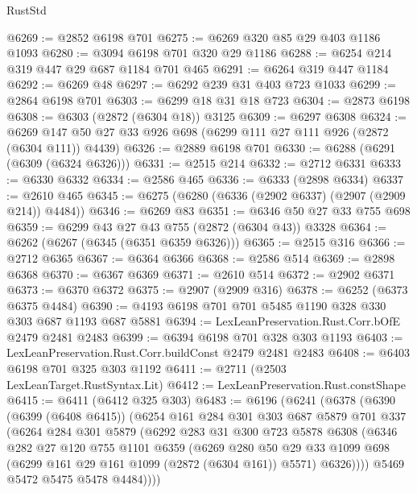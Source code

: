 \begin{lexlean}{RustStd}
\begin{coremodule}
@6269 := @2852 @6198 @701
@6275 := @6269 @320 @85 @29 @403 @1186 @1093
@6280 := @3094 @6198 @701 @320 @29 @1186
@6288 := @6254 @214 @319 @447 @29 @687 @1184 @701 @465
@6291 := @6264 @319 @447 @1184
@6292 := @6269 @48
@6297 := @6292 @239 @31 @403 @723 @1033
@6299 := @2864 @6198 @701
@6303 := @6299 @18 @31 @18 @723
@6304 := @2873 @6198
@6308 := @6303 (@2872 (@6304 @18)) @3125
@6309 := @6297 @6308
@6324 := @6269 @147 @50 @27 @33 @926 @698 (@6299 @111 @27 @111 @926 (@2872 (@6304 @111)) @4439)
@6326 := @2889 @6198 @701
@6330 := @6288 (@6291 (@6309 (@6324 @6326)))
@6331 := @2515 @214
@6332 := @2712 @6331
@6333 := @6330 @6332
@6334 := @2586 @465
@6336 := @6333 (@2898 @6334)
@6337 := @2610 @465
@6345 := @6275 (@6280 (@6336 (@2902 @6337) (@2907 (@2909 @214)) @4484))
@6346 := @6269 @83
@6351 := @6346 @50 @27 @33 @755 @698
@6359 := @6299 @43 @27 @43 @755 (@2872 (@6304 @43)) @3328
@6364 := @6262 (@6267 (@6345 (@6351 @6359 @6326)))
@6365 := @2515 @316
@6366 := @2712 @6365
@6367 := @6364 @6366
@6368 := @2586 @514
@6369 := @2898 @6368
@6370 := @6367 @6369
@6371 := @2610 @514
@6372 := @2902 @6371
@6373 := @6370 @6372
@6375 := @2907 (@2909 @316)
@6378 := @6252 (@6373 @6375 @4484)
@6390 := @4193 @6198 @701 @701 @5485 @1190 @328 @330 @303 @687 @1193 @687 @5881
@6394 := LexLeanPreservation.Rust.Corr.bOfE @2479 @2481 @2483
@6399 := @6394 @6198 @701 @328 @303 @1193
@6403 := LexLeanPreservation.Rust.Corr.buildConst @2479 @2481 @2483
@6408 := @6403 @6198 @701 @325 @303 @1192
@6411 := @2711 (@2503 LexLeanTarget.RustSyntax.Lit)
@6412 := LexLeanPreservation.Rust.constShape
@6415 := @6411 (@6412 @325 @303)
@6483 := @6196
    (@6241
      (@6378
        (@6390
          (@6399 (@6408 @6415))
          (@6254
            @161
            @284
            @301
            @303
            @687
            @5879
            @701
            @337
            (@6264
              @284
              @301
              @5879
              (@6292
                @283
                @31
                @300
                @723
                @5878
                @6308
                (@6346
                  @282
                  @27
                  @120
                  @755
                  @1101
                  @6359
                  (@6269
                    @280
                    @50
                    @29
                    @33
                    @1099
                    @698
                    (@6299 @161 @29 @161 @1099 (@2872 (@6304 @161)) @5571)
                    @6326))))
            @5469
            @5472
            @5475
            @5478
            @4484))))

\end{coremodule}
\end{lexlean}
